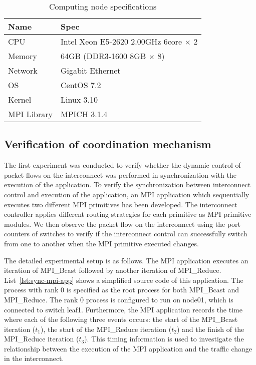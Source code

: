 \begin{table}
    \centering
    \caption{Computing node specifications}%
    \label{tbl:node-spec}
    \begin{tabular}{ll}
        \toprule
        Name        & Spec                                        \\ \midrule
        CPU         & Intel Xeon E5-2620 2.00GHz 6core $\times$ 2 \\
        Memory      & 64GB (DDR3-1600 8GB $\times$ 8)             \\
        Network     & Gigabit Ethernet                            \\
        OS          & CentOS 7.2                                  \\
        Kernel      & Linux 3.10                                  \\
        MPI Library & MPICH 3.1.4                                 \\ \bottomrule
    \end{tabular}
\end{table}

\subsection{Verification of coordination mechanism}

The first experiment was conducted to verify whether the dynamic control
of packet flows on the interconnect was performed in synchronization
with the execution of the application. To verify the synchronization
between interconnect control and execution of the application, an MPI
application which sequentially executes two different MPI primitives has
been developed. The interconnect controller applies different routing
strategies for each primitive as MPI primitive modules. We then observe
the packet flow on the interconnect using the port counters of switches
to verify if the interconnect control can successfully switch from one
to another when the MPI primitive executed changes.

The detailed experimental setup is as follows. The MPI application
executes an iteration of MPI\_Bcast followed by another iteration of
MPI\_Reduce. List~\ref{lst:sync-mpi-app} shows a simplified source code
of this application. The process with rank 0 is specified as the root
process for both MPI\_Bcast and MPI\_Reduce. The rank 0 process is
configured to run on node01, which is connected to switch leaf1.
Furthermore, the MPI application records the time where each of the
following three events occurs: the start of the MPI\_Bcast iteration
(\(t_1\)), the start of the MPI\_Reduce iteration (\(t_2\)) and the
finish of the MPI\_Reduce iteration (\(t_3\)). This timing information
is used to investigate the relationship between the execution of the MPI
application and the traffic change in the interconnect.

